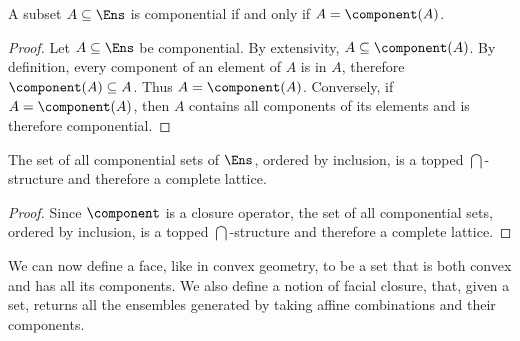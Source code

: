\begin{mathSection}
	\begin{coro}
		A subset $A \subseteq \Ens$ is componential if and only if $A = \component(A)$.
	\end{coro}
	
	\begin{proof}
		Let $A \subseteq \Ens$ be componential. By extensivity, $A \subseteq \component(A)$. By definition, every component of an element of $A$ is in $A$, therefore $\component(A) \subseteq A$. Thus $A = \component(A)$. Conversely, if $A = \component(A)$, then $A$ contains all components of its elements and is therefore componential.
	\end{proof}
	
	\begin{prop}
		The set of all componential sets of $\Ens$, ordered by inclusion, is a topped $\bigcap$-structure and therefore a complete lattice.
	\end{prop}
	
	\begin{proof}
		Since $\component$ is a closure operator, the set of all componential sets, ordered by inclusion, is a topped $\bigcap$-structure and therefore a complete lattice.
	\end{proof}
\end{mathSection}

We can now define a face, like in convex geometry, to be a set that is both convex and has all its components. We also define a notion of facial closure, that, given a set, returns all the ensembles generated by taking affine combinations and their components.

